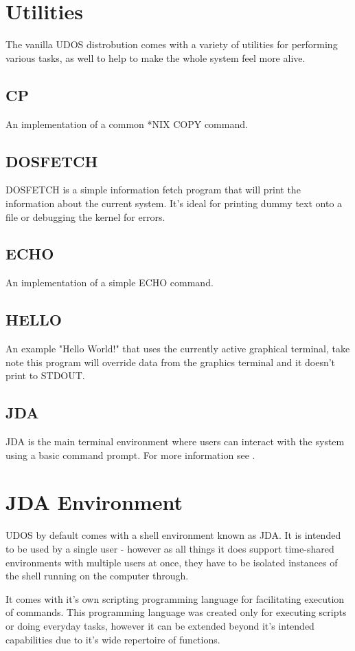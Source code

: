 \documentclass{article}
\begin{document}
\section{Utilities}
The vanilla UDOS distrobution comes with a variety of utilities for performing various tasks, as well to help to make the whole system feel more alive.

\subsection{CP}
An implementation of a common *NIX COPY command.
\subsection{DOSFETCH}
DOSFETCH is a simple information fetch program that will print the information about the current system. It's ideal for printing dummy text onto a file or debugging the kernel for errors.
\subsection{ECHO}
An implementation of a simple ECHO command.
\subsection{HELLO}
An example "Hello World!" that uses the currently active graphical terminal, take note this program will override data from the graphics terminal and it doesn't print to STDOUT.
\subsection{JDA}
JDA is the main terminal environment where users can interact with the system using a basic command prompt. For more information see .

\section{JDA Environment}
\label{sec:jda}
UDOS by default comes with a shell environment known as JDA. It is intended to be used by a single user - however as all things it does support time-shared environments with multiple users at once, they have to be isolated instances of the shell running on the computer through.

It comes with it's own scripting programming language for facilitating execution of commands. This programming language was created only for executing scripts or doing everyday tasks, however it can be extended beyond it's intended capabilities due to it's wide repertoire of functions.
\end{document}
